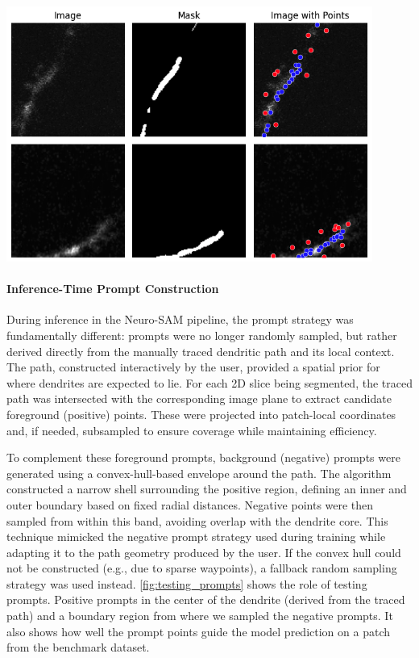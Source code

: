 \begin{center}
\includegraphics[width=0.9\textwidth]{figures/16_training_prompts.png}
\label{fig:training_prompts}
\end{center}

\paragraph{Inference-Time Prompt Construction}

During inference in the Neuro-\gls{SAM} pipeline, the prompt strategy was fundamentally different: prompts were no longer randomly sampled, but rather derived directly from the manually traced dendritic path and its local context. The path, constructed interactively by the user, provided a spatial prior for where dendrites are expected to lie. For each 2D slice being segmented, the traced path was intersected with the corresponding image plane to extract candidate foreground (positive) points. These were projected into patch-local coordinates and, if needed, subsampled to ensure coverage while maintaining efficiency.

To complement these foreground prompts, background (negative) prompts were generated using a convex-hull-based envelope around the path. The algorithm constructed a narrow shell surrounding the positive region, defining an inner and outer boundary based on fixed radial distances. Negative points were then sampled from within this band, avoiding overlap with the dendrite core. This technique mimicked the negative prompt strategy used during training while adapting it to the path geometry produced by the user. If the convex hull could not be constructed (e.g., due to sparse waypoints), a fallback random sampling strategy was used instead. \autoref{fig:testing_prompts} shows the role of testing prompts. Positive prompts in the center of the dendrite (derived from the traced path) and a boundary region from where we sampled the negative prompts. It also shows how well the prompt points guide the model prediction on a patch from the benchmark dataset.


